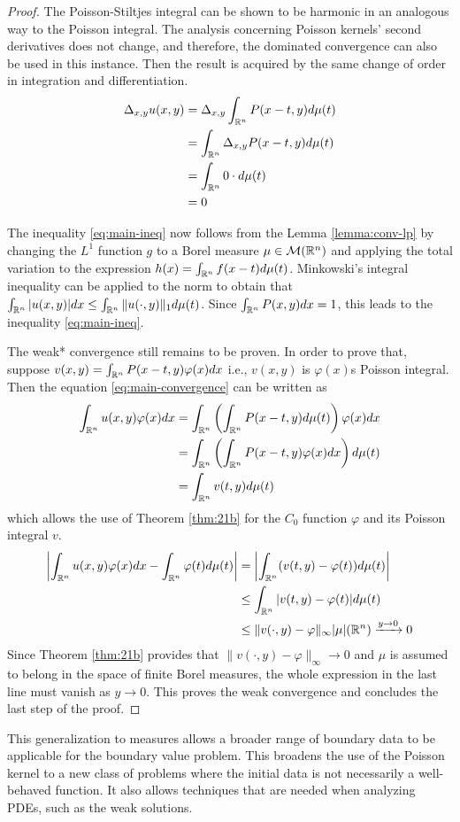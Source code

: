 \begin{proof}
    The Poisson-Stiltjes integral can be shown to be harmonic in an analogous way to the Poisson integral. The analysis concerning Poisson kernels' second derivatives does not change, and therefore, the dominated convergence can also be used in this instance. Then the result is acquired by the same change of order in integration and differentiation.
    \begin{align*}
        \Delta_{x,y} u(x,y)&=\Delta_{x,y}\int_{\mathbb R^n}P(x-t,y)d\mu(t) \\
        &=\int_{\mathbb R^n}\Delta_{x,y}P(x-t,y)d\mu(t) \\
        &=\int_{\mathbb R^n}0\cdot d\mu(t) \\
        &=0
    \end{align*}

    The inequality \ref{eq:main-ineq} now follows from the Lemma \ref{lemma:conv-lp} by changing the $L^1$ function $g$ to a Borel measure $\mu\in\mathcal M(\mathbb R^n)$ and applying the total variation to the expression $h(x)=\int_{\mathbb R^n}f(x-t)d\mu(t)$. Minkowski's integral inequality can be applied to the norm to obtain that $\int_{\mathbb R^n}|u(x,y)|dx\leq\int_{\mathbb R^n}\|u(\cdot,y)\|_1d\mu(t)$. Since $\int_{\mathbb R^n}P(x,y)dx=1$, this leads to the inequality \ref{eq:main-ineq}.

    The weak* convergence still remains to be proven. In order to prove that, suppose $v(x,y)=\int_{\mathbb R^n}P(x-t,y)\varphi(x)dx$ i.e., $v(x,y)$ is $\varphi(x)$s Poisson integral. Then the equation \ref{eq:main-convergence} can be written as
    \begin{align*}
        \int_{\mathbb R^n}u(x,y)\varphi(x)dx&=\int_{\mathbb R^n}\left(\int_{\mathbb R^n}P(x-t,y)d\mu(t)\right)\varphi(x)dx \\
        &=\int_{\mathbb R^n}\left(\int_{\mathbb R^n}P(x-t,y)\varphi(x)dx\right)d\mu(t) \\
        &=\int_{\mathbb R^n}v(t,y)d\mu(t)
    \end{align*}
    which allows the use of Theorem \ref{thm:21b} for the $C_0$ function $\varphi$ and its Poisson integral $v$.
    \begin{align*}
        \left|\int_{\mathbb R^n}u(x,y)\varphi(x)dx-\int_{\mathbb R^n}\varphi(t)d\mu(t)\right|&=\left|\int_{\mathbb R^n}(v(t,y)-\varphi(t))d\mu(t)\right| \\
        &\leq\int_{\mathbb R^n}|v(t,y)-\varphi(t)|d\mu(t) \\
        &\leq\|v(\cdot,y)-\varphi\|_\infty|\mu|(\mathbb R^n)\xrightarrow{y\rightarrow0}0
    \end{align*}
    Since Theorem \ref{thm:21b} provides that $\|v(\cdot,y)-\varphi\|_\infty\rightarrow0$ and $\mu$ is assumed to belong in the space of finite Borel measures, the whole expression in the last line must vanish as $y\rightarrow0$. This proves the weak convergence and concludes the last step of the proof. 
\end{proof}

This generalization to measures allows a broader range of boundary data to be applicable for the boundary value problem. This broadens the use of the Poisson kernel to a new class of problems where the initial data is not necessarily a well-behaved function. It also allows techniques that are needed when analyzing PDEs, such as the weak solutions. 
